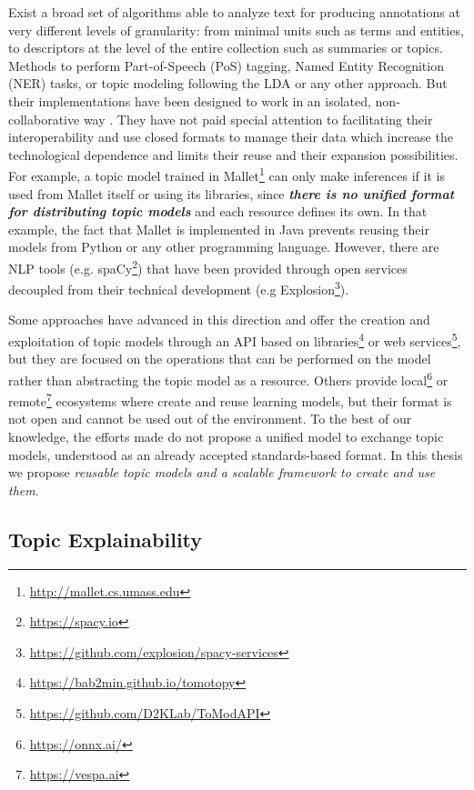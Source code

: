 Exist a broad set of algorithms able to analyze text for producing annotations at very different levels of granularity: from minimal units such as terms and entities, to descriptors at the level of the entire collection such as  summaries or topics. Methods to perform Part-of-Speech (PoS) tagging,  Named Entity Recognition (NER) tasks, or topic modeling following the LDA or any other approach. But their implementations have been designed to work in an isolated, non-collaborative way \citep{Manning2014TheToolkit, Agerri2014}. They have not paid special attention to facilitating their interoperability and use closed formats to manage their data  which increase the technological dependence and limits their reuse and their expansion possibilities. For example, a topic model trained in Mallet\footnote{\url{http://mallet.cs.umass.edu}} can only make inferences if it is used from Mallet itself or using its libraries, since \textbf{\textit{there is no unified format for distributing topic models}} and each resource defines its own. In that example, the fact that Mallet is implemented in Java prevents reusing their models from Python or any other programming language. However, there are NLP tools (e.g. spaCy\footnote{\url{https://spacy.io}}) that have been provided through open services  decoupled from their technical development (e.g Explosion\footnote{\url{https://github.com/explosion/spacy-services}}).

Some approaches have advanced in this direction and offer the creation and exploitation of topic models through an API based on libraries\footnote{\url{https://bab2min.github.io/tomotopy}} or web services\footnote{\url{https://github.com/D2KLab/ToModAPI}}\citep{Lisena:NLPOSS2020}, but they are focused on the operations that can be performed on the model rather than abstracting the topic model as a resource. Others provide local\footnote{\url{https://onnx.ai/}} or remote\footnote{\url{https://vespa.ai}} ecosystems where create and reuse learning models, but their format is not open and cannot be used out of the environment. To the best of our knowledge, the efforts made do not propose a unified model to exchange topic models, understood as an already accepted standards-based format. In this thesis we propose \textit{reusable topic models and a scalable framework to create and use them}.  
 

\subsection{Topic Explainability}
\label{sec:topic-explainability}

